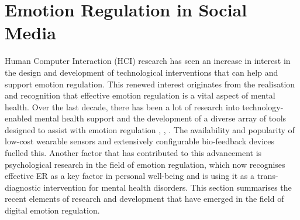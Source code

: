 \documentclass[lettersize,journal]{IEEEtran}
\begin{document}
\section{Emotion Regulation in Social Media}
Human Computer Interaction (HCI) research has seen an increase in interest in the design and development of technological interventions that can help and support emotion regulation. This renewed interest originates from the realisation and recognition that effective emotion regulation is a vital aspect of mental health. Over the last decade, there has been a lot of research into technology-enabled mental health support and the development of a diverse array of tools designed to assist with emotion regulation \cite{wadley2020digital}, \cite{smith2022digital}, \cite{slovak2022designing}. The availability and popularity of low-cost wearable sensors and extensively configurable bio-feedback devices fuelled this. Another factor that has contributed to this advancement is psychological research in the field of emotion regulation, which now recognises effective ER as a key factor in personal well-being and is using it as a trans-diagnostic intervention for mental health disorders. This section summarises the recent elements of research and development that have emerged in the field of digital emotion regulation. 
\end{document}
